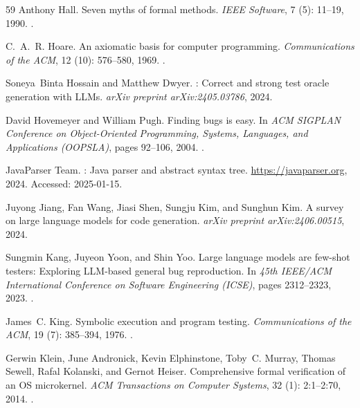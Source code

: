 \documentclass[11pt]{article}
\begin{document}
\begin{thebibliography}{59}
Anthony Hall.
\newblock Seven myths of formal methods.
\newblock \emph{IEEE Software}, 7 (5): 11--19, 1990.
\newblock {}.

C.~A.~R. Hoare.
\newblock An axiomatic basis for computer programming.
\newblock \emph{Communications of the ACM}, 12 (10):
  576--580, 1969.
\newblock {}.

Soneya~Binta Hossain and Matthew Dwyer.
: Correct and strong test oracle generation with {LLM}s.
\newblock \emph{arXiv preprint arXiv:2405.03786}, 2024.

David Hovemeyer and William Pugh.
\newblock Finding bugs is easy.
\newblock In \emph{ACM SIGPLAN Conference on Object-Oriented Programming,
  Systems, Languages, and Applications (OOPSLA)}, pages 92--106, 2004.
\newblock {}.

{JavaParser Team}.
: Java parser and abstract syntax tree.
\newblock \url{https://javaparser.org}, 2024.
\newblock Accessed: 2025-01-15.

Juyong Jiang, Fan Wang, Jiasi Shen, Sungju Kim, and Sunghun Kim.
\newblock A survey on large language models for code generation.
\newblock \emph{arXiv preprint arXiv:2406.00515}, 2024.

Sungmin Kang, Juyeon Yoon, and Shin Yoo.
\newblock Large language models are few-shot testers: Exploring {LLM}-based
  general bug reproduction.
\newblock In \emph{45th IEEE/ACM International Conference on Software
  Engineering (ICSE)}, pages 2312--2323, 2023.
\newblock {}.

James~C. King.
\newblock Symbolic execution and program testing.
\newblock \emph{Communications of the ACM}, 19 (7): 385--394,
  1976.
\newblock {}.

Gerwin Klein, June Andronick, Kevin Elphinstone, Toby~C. Murray, Thomas Sewell,
  Rafal Kolanski, and Gernot Heiser.
\newblock Comprehensive formal verification of an {OS} microkernel.
\newblock \emph{ACM Transactions on Computer Systems}, 32
  (1): 2:1--2:70, 2014.
\newblock {}.


\end{thebibliography}
\end{document}
